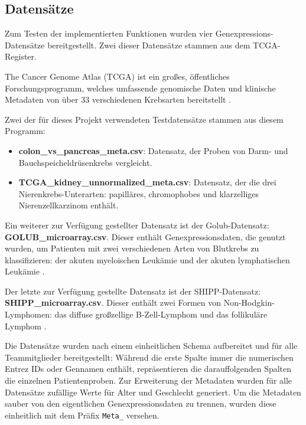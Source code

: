 \documentclass[12pt]{article}
\begin{document}
\subsection{Datensätze}

\noindent Zum Testen der implementierten Funktionen wurden vier Genexpressions-Datensätze bereitgestellt. Zwei dieser Datensätze stammen aus dem TCGA-Register. 

\noindent The Cancer Genome Atlas (TCGA) ist ein großes, öffentliches Forschungsprogramm, welches umfassende genomische Daten und klinische Metadaten von über 33 verschiedenen Krebsarten bereitstellt \cite{CGARN2013}. 

\noindent Zwei der für dieses Projekt verwendeten Testdatensätze stammen aus diesem Programm: 
\begin{itemize}
	\item \textbf{colon\_vs\_pancreas\_meta.csv}: Datensatz, der Proben von Darm- und Bauchspeicheldrüsenkrebs vergleicht.
	\item \textbf{TCGA\_kidney\_unnormalized\_meta.csv}: Datensatz, der die drei Nierenkrebs-Unterarten: papilläres, chromophobes und klarzelliges Nierenzellkarzinom enthält.
\end{itemize}
\noindent Ein weiterer zur Verfügung gestellter Datensatz ist der Golub-Datensatz: \textbf{GOLUB\_microarray.csv}. Dieser enthält Genexpressionsdaten, die genutzt wurden, um Patienten mit zwei verschiedenen Arten von Blutkrebs zu klassifizieren: der akuten myeloischen Leukämie und der akuten lymphatischen Leukämie \cite{Golub1999}. 

\noindent Der letzte zur Verfügung gestellte Datensatz ist der SHIPP-Datensatz: \textbf{SHIPP\_microarray.csv}. Dieser enthält zwei Formen von Non-Hodgkin-Lymphomen: das diffuse großzellige B-Zell-Lymphom und das follikuläre Lymphom \cite{Shipp2002}.

\noindent Die Datensätze wurden nach einem einheitlichen Schema aufbereitet und für alle Teammitglieder bereitgestellt: Während die erste Spalte immer die numerischen Entrez IDs oder Gennamen enthält, repräsentieren die darauffolgenden Spalten die einzelnen Patientenproben. Zur Erweiterung der Metadaten wurden für alle Datensätze zufällige Werte für Alter und Geschlecht generiert. Um die Metadaten sauber von den eigentlichen Genexpressionsdaten zu trennen, wurden diese einheitlich mit dem Präfix \texttt{Meta\_} versehen.

\newpage
\pagestyle{fancy}
\fancyhead{}
\end{document}
